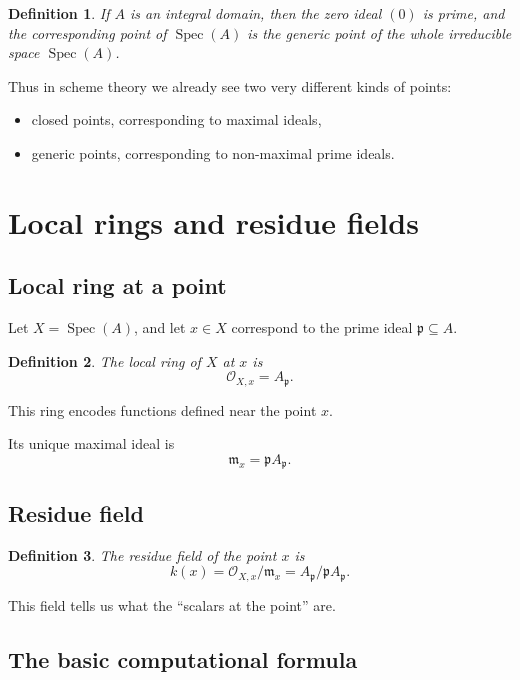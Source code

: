 \documentclass[12pt,a4paper]{article}
\theoremstyle{notespace}
\newtheorem{definition}{Definition}[section]
\newcommand{\Spec}{\operatorname{Spec}}
\newcommand{\OO}{\mathcal O}
\newcommand{\m}{\mathfrak m}
\newcommand{\p}{\mathfrak p}
\theoremstyle{definition}
\begin{document}
	\begin{definition}
		If \(A\) is an integral domain, then the zero ideal \((0)\) is prime, and the corresponding point of \(\Spec(A)\) is the \emph{generic point} of the whole irreducible space \(\Spec(A)\).
	\end{definition}
	
	Thus in scheme theory we already see two very different kinds of points:
	
	\begin{itemize}[leftmargin=2em]
		\item closed points, corresponding to maximal ideals,
		\item generic points, corresponding to non-maximal prime ideals.
	\end{itemize}
	
	\section{Local rings and residue fields}
	
	\subsection{Local ring at a point}
	
	Let \(X=\Spec(A)\), and let \(x\in X\) correspond to the prime ideal \(\p\subseteq A\).
	
	\begin{definition}
		The \emph{local ring} of \(X\) at \(x\) is
		\[
		\OO_{X,x}=A_{\p}.
		\]
	\end{definition}
	
	This ring encodes functions defined near the point \(x\).
	
	Its unique maximal ideal is
	\[
	\m_x=\p A_{\p}.
	\]
	
	\subsection{Residue field}
	
	\begin{definition}
		The \emph{residue field} of the point \(x\) is
		\[
		k(x)=\OO_{X,x}/\m_x=A_{\p}/\p A_{\p}.
		\]
	\end{definition}
	
	This field tells us what the ``scalars at the point'' are.
	
	\subsection{The basic computational formula}
	
\end{document}
